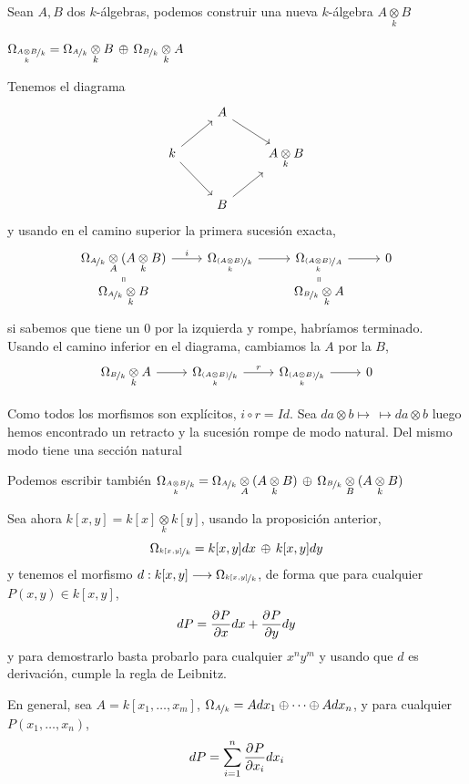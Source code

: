 Sean $A,B$ dos $k$-\'algebras, podemos construir una nueva $k$-\'algebra $A \underset{k}{\otimes} B$
\begin{prop}
    $\Omega_{\nicefrac{A \underset{k}{\otimes} B}{k}} = \Omega_{\nicefrac{A}{k}} \underset{k}{\otimes} B \, \oplus \,  \Omega_{\nicefrac{B}{k}} \underset{k}{\otimes} A $
\end{prop}
\begin{dem}
    Tenemos el diagrama
    $$\bt & A \arrow{rd} \\ k \arrow{ru} \arrow{rd} & & A\underset{k}{\otimes} B \\ & B\arrow{ru} \et$$
    y usando en el camino superior la primera sucesi\'on exacta,
    $$\bt \Omega_{\nicefrac{A}{k}} \underset{A}{\otimes} (A \underset{k}{\otimes} B) \rar{i} & \Omega_{\nicefrac{(A \underset{k}{\otimes} B)}{k}} \rar & \Omega_{\nicefrac{(A \underset{k}{\otimes} B)}{A}} \rar & 0 \\[-5mm]  \Omega_{\nicefrac{A}{k}} \underset{k}{\otimes} B  \arrow[equal]{u}& & \Omega_{\nicefrac{B}{k}} \underset{k}{\otimes} A \arrow[equal]{u}\et$$
    si sabemos que tiene un 0 por la izquierda y rompe, habr\'iamos terminado. Usando el camino inferior en el diagrama, cambiamos la $A$ por la $B$,
    $$\bt  \Omega_{\nicefrac{B}{k}} \underset{k}{\otimes} A \rar & \Omega_{\nicefrac{(A \underset{k}{\otimes} B)}{k}} \rar{r} & \Omega_{\nicefrac{(A \underset{k}{\otimes} B)}{k}} \rar & 0 \et$$

    Como todos los morfismos son expl\'icitos, $i \circ r = Id$. Sea $da\otimes b \longmapsto \, \longmapsto da \otimes b$ luego hemos encontrado un retracto y la sucesi\'on rompe de modo natural. Del mismo modo tiene una secci\'on natural 
\end{dem}

\begin{obs}
    Podemos escribir tambi\'en $\Omega_{\nicefrac{A \underset{k}{\otimes} B}{k}} = \Omega_{\nicefrac{A}{k}} \underset{A}{\otimes} (A \underset{k}{\otimes} B) \, \oplus \,  \Omega_{\nicefrac{B}{k}} \underset{B}{\otimes} (A \underset{k}{\otimes} B)$
\end{obs}

\begin{ejem}
    Sea ahora $k[x,y] = k[x] \underset{k}{\otimes} k[y]$, usando la proposici\'on anterior, 
    $$ \Omega_{\nicefrac{k[x,y]}{k}} = k[x,y] dx \, \oplus \, k[x,y] dy$$
    y tenemos el morfismo $d: k[x,y] \longrightarrow \Omega_{\nicefrac{k[x,y]}{k}}$, de forma que para cualquier $P(x,y) \in k[x,y]$, 
    $$dP = \dfrac{\partial^{} P}{\partial x} dx + \dfrac{\partial^{} P}{\partial y} dy $$
    y para demostrarlo basta probarlo para cualquier $x^n y^m$ y usando que $d$ es derivaci\'on, cumple la regla de Leibnitz.
\end{ejem}
\begin{ejem}
    En general, sea $A = k[x_1, \ldots, x_m]$, $\Omega_{\nicefrac{A}{k}} = Adx_1 \oplus \cdots \oplus Adx_n$, y para cualquier $P(x_1,\ldots, x_n)$,
    $$dP = \sum_{i=1}^n \dfrac{\partial^{} P}{\partial x_i} dx_i$$  
\end{ejem}
